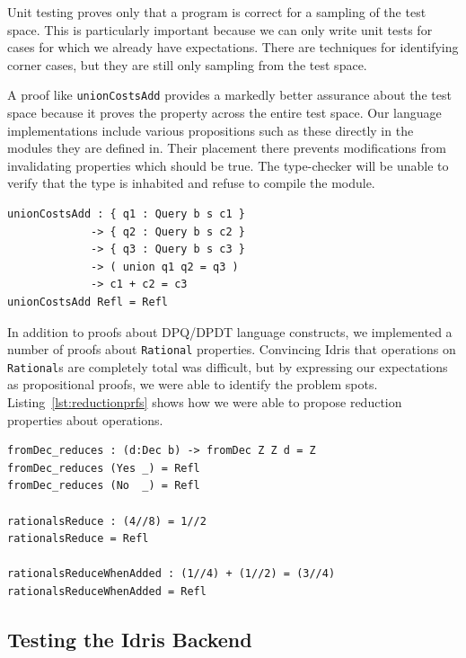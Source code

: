 \documentclass[12pt]{report}
\begin{document}
Unit testing proves only that a program is correct for a sampling of the test space.
This is particularly important because we can only write unit tests for cases for which we already have expectations.
There are techniques for identifying corner cases, but they are still only sampling from the test space.

A proof like \texttt{unionCostsAdd} provides a markedly better assurance about the test space because it proves the property across the entire test space.
Our language implementations include various propositions such as these directly in the modules they are defined in.
Their placement there prevents modifications from invalidating properties which should be true.
The type-checker will be unable to verify that the type is inhabited and refuse to compile the module.

\begin{lstlisting}[float,caption={Example of using types to assert properties of programs (Curry-Howard correspondence)},label={lst:curryhoward}]
unionCostsAdd : { q1 : Query b s c1 }
             -> { q2 : Query b s c2 }
             -> { q3 : Query b s c3 }
             -> ( union q1 q2 = q3 )
             -> c1 + c2 = c3
unionCostsAdd Refl = Refl
\end{lstlisting}

In addition to proofs about DPQ/DPDT language constructs, we implemented a number of proofs about \texttt{Rational} properties.
Convincing Idris that operations on \texttt{Rational}s are completely total was difficult, but by expressing our expectations as propositional proofs, we were able to identify the problem spots.
Listing~\ref{lst:reductionprfs} shows how we were able to propose reduction properties about operations.

\begin{lstlisting}[float,caption={Examples of reduction property proofs for \texttt{Rational}s},label={lst:reductionprfs}]
fromDec_reduces : (d:Dec b) -> fromDec Z Z d = Z
fromDec_reduces (Yes _) = Refl
fromDec_reduces (No  _) = Refl

rationalsReduce : (4//8) = 1//2
rationalsReduce = Refl

rationalsReduceWhenAdded : (1//4) + (1//2) = (3//4)
rationalsReduceWhenAdded = Refl
\end{lstlisting}

\subsection{Testing the Idris Backend}
\end{document}
